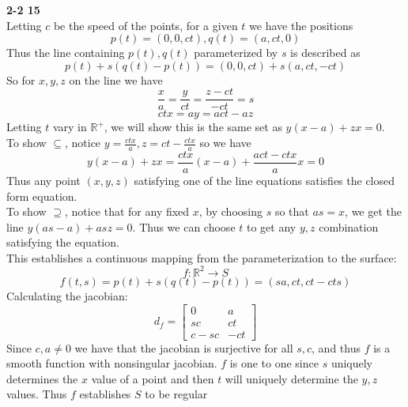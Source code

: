 \documentclass[12pt]{article}
\newenvironment{ques}[1]{\textbf{#1}\vspace{1 mm}\\ }{\bigskip}
\theoremstyle{definition}
\newcommand{\R}{\mathbb R}
\begin{document}
\begin{ques}{2-2 15}
	Letting $c$ be the speed of the points, for a given $t$ we have the positions
	$$p(t) = (0,0,ct), q(t) = (a,ct,0)$$
	Thus the line containing $p(t),q(t)$ parameterized by $s$ is described as
	$$p(t) + s(q(t) - p(t)) = (0,0,ct) + s(a,ct,-ct)$$
	So for $x,y,z$ on the line we have
	$$\frac x a = \frac{y}{ct} = \frac{z - ct}{-ct} = s$$
	$$ct x = a y = act - az$$
	Letting $t$ vary in $\R^+$, we will show this is the same set as $y(x-a) +
	zx = 0$. \\
	To show $\subseteq$, notice $y = \frac{ctx}{a}, z = ct - \frac{ctx}{a}$ so we have
	$$y(x - a) + zx = \frac{ctx}{a}(x -a) + \frac{act - ctx}{a}x = 0$$
	Thus any point $(x,y,z)$ satisfying one of the line equations satisfies the
	closed form equation.\\
	To show $\supseteq$, notice that for any fixed $x$, by choosing $s$ so that
	$as = x$, we get the line $y(as - a) + asz = 0$. Thus we can choose $t$ to
	get any $y,z$ combination satisfying the equation.\\
	This establishes a continuous mapping from the parameterization to the surface:
	$$f: \R^2 \to S$$
	$$f(t,s) = p(t) + s(q(t) - p(t)) = (sa, ct, ct - cts)$$
	Calculating the jacobian:
	$$d_f =
	\begin{bmatrix}
		0 & a\\
		sc & ct\\
		c-sc & -ct
	\end{bmatrix}
	$$
	Since $c, a \neq 0$ we have that the jacobian is surjective for all $s,c$,
	and thus $f$ is a smooth function with nonsingular jacobian. $f$ is one to
	one since $s$ uniquely determines the $x$ value of a point and then $t$
	will uniquely determine the $y,z$ values.  Thus $f$ establishes $S$ to be
	regular
\end{ques}
\end{document}
